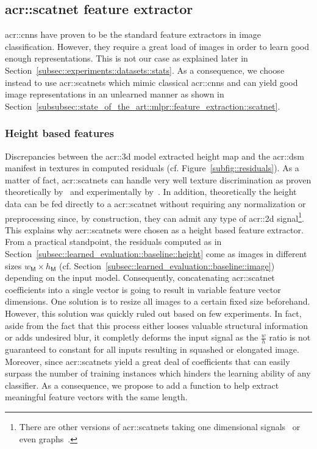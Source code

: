     \subsection{\acrshort*{acr::scatnet} feature extractor}
        \label{subsec::learned_evaluation::richer_features::image}
        \glspl{acr::cnn} have proven to be the standard feature extractors in image classification.
        However, they require a great load of images in order to learn good enough representations.
        This is not our case as explained later in Section~\ref{subsec::experiments::datasets::stats}.
        As a consequence, we choose instead to use \glspl{acr::scatnet} which mimic classical \glspl{acr::cnn} and can yield good image representations in an unlearned manner as shown in Section~\ref{subsubsec::state_of_the_art::mlpr::feature_extraction::scatnet}.

        \subsubsection{Height based features}
            Discrepancies between the \gls{acr::3d} model extracted height map and the \gls{acr::dsm} manifest in textures in computed residuals (cf. Figure~\ref{subfig::residuals}).
            As a matter of fact, \glspl{acr::scatnet} can handle very well texture discrimination as proven theoretically by~\textcite{mallat2012group} and experimentally by~\textcite{bruna2013invariant,sifre2013rotation}.
            In addition, theoretically the height data can be fed directly to a \gls{acr::scatnet} without requiring any normalization or preprocessing since, by construction, they can admit any type of \gls{acr::2d} signal\footnote{There are other versions of \glspl{acr::scatnet} taking one dimensional signals~\parencite{anden2014deep} or even graphs~\parencite{eickenberg2018solid}.}.
            This explains why \glspl{acr::scatnet} were chosen as a height based feature extractor.\\

            From a practical standpoint, the residuals computed as in Section~\ref{subsec::learned_evaluation::baseline::height} come as images in different sizes \(w_{\mathsf{M}} \times h_{\mathsf{M}}\) (cf. Section~\ref{subsec::learned_evaluation::baseline::image}) depending on the input model.
            Consequently, concatenating \gls{acr::scatnet} coefficients into a single vector is going to result in variable feature vector dimensions.
            One solution is to resize all images to a certain fixed size beforehand.
            However, this solution was quickly ruled out based on few experiments.
            In fact, aside from the fact that this process either looses valuable structural information or adds undesired blur, it completly deforms the input signal as the \(\frac{w}{h}\) ratio is not guaranteed to constant for all inputs resulting in squashed or elongated image.
            Moreover, since \glspl{acr::scatnet} yield a great deal of coefficients that can easily surpass the number of training instances which hinders the learning ability of any classifier.
            As a consequence, we propose to add a function to help extract meaningful feature vectors with the same length.\\

